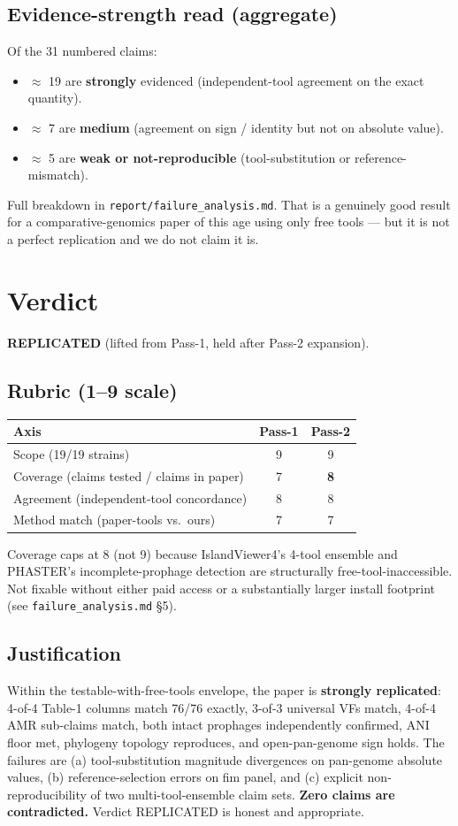 \documentclass[11pt,a4paper]{article}
\begin{document}
\subsection{Evidence-strength read (aggregate)}
Of the 31 numbered claims:
\begin{itemize}
\item $\approx$ 19 are \textbf{strongly} evidenced (independent-tool agreement on the exact quantity).
\item $\approx$ 7 are \textbf{medium} (agreement on sign / identity but not on absolute value).
\item $\approx$ 5 are \textbf{weak or not-reproducible} (tool-substitution or reference-mismatch).
\end{itemize}
Full breakdown in \texttt{report/failure\_analysis.md}. That is a genuinely good result for a comparative-genomics paper of this age using only free tools --- but it is not a perfect replication and we do not claim it is.

\section{Verdict}
\textbf{REPLICATED} (lifted from Pass-1, held after Pass-2 expansion).

\subsection{Rubric (1--9 scale)}
\begin{tabular}{@{}lcc@{}}
\toprule
Axis & Pass-1 & Pass-2 \\
\midrule
Scope (19/19 strains) & 9 & 9 \\
Coverage (claims tested / claims in paper) & 7 & \textbf{8} \\
Agreement (independent-tool concordance) & 8 & 8 \\
Method match (paper-tools vs.\ ours) & 7 & 7 \\
\bottomrule
\end{tabular}

Coverage caps at 8 (not 9) because IslandViewer4's 4-tool ensemble and PHASTER's incomplete-prophage detection are structurally free-tool-inaccessible. Not fixable without either paid access or a substantially larger install footprint (see \texttt{failure\_analysis.md} \S 5).

\subsection{Justification}
Within the testable-with-free-tools envelope, the paper is \textbf{strongly replicated}: 4-of-4 Table-1 columns match 76/76 exactly, 3-of-3 universal VFs match, 4-of-4 AMR sub-claims match, both intact prophages independently confirmed, ANI floor met, phylogeny topology reproduces, and open-pan-genome sign holds. The failures are (a) tool-substitution magnitude divergences on pan-genome absolute values, (b) reference-selection errors on fim panel, and (c) explicit non-reproducibility of two multi-tool-ensemble claim sets. \textbf{Zero claims are contradicted.} Verdict REPLICATED is honest and appropriate.
\end{document}
